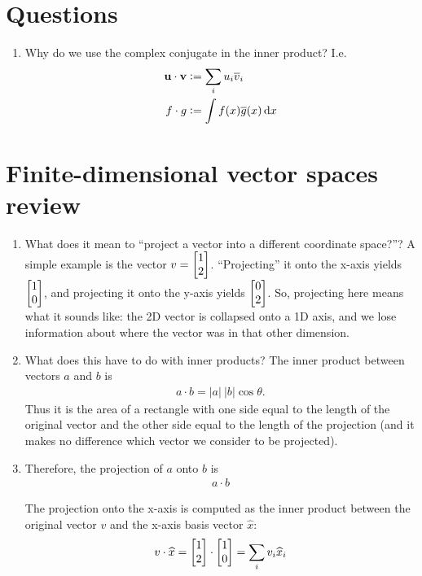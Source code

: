 \section{Questions}
\begin{enumerate}
\item Why do we use the complex conjugate in the inner product? I.e.
\begin{align*}
  \vec{u} \cdot \vec{v} &:= \sum_i u_i \bar{v}_i \\
  f \cdot g &:= \int f(x) \bar{g}(x) \dx
\end{align*}
\end{enumerate}



\section{Finite-dimensional vector spaces review}
\begin{enumerate}
\item What does it mean to ``project a vector into a different coordinate space?''? A simple example is the
  vector $v = \begin{bmatrix}1\\2\end{bmatrix}$. ``Projecting'' it onto the x-axis yields $\begin{bmatrix}1\\0\end{bmatrix}$, and projecting it onto the y-axis
  yields $\begin{bmatrix}0\\2\end{bmatrix}$. So, projecting here means what it sounds like: the 2D vector is collapsed onto a 1D axis,
  and we lose information about where the vector was in that other dimension.
\item What does this have to do with inner products? The inner product between vectors $a$ and $b$ is
\begin{align*}
  a \cdot b = |a| ~ |b|\cos\theta.
\end{align*}
Thus it is the area of a rectangle with one side equal to the length of the original vector and the other side
equal to the length of the projection (and it makes no difference which vector we consider to be projected).
\item Therefore, the projection of $a$ onto $b$ is
\begin{align*}
  a \cdot b
\end{align*}


  The projection onto the x-axis is computed as the inner
  product between the original vector $v$ and the x-axis basis vector $\hat{x}$:
\begin{align*}
  v \cdot \widehat{x} = \begin{bmatrix}1\\2\end{bmatrix} \cdot \begin{bmatrix}1\\0\end{bmatrix} = \sum_i v_i \widehat{x}_i
\end{align*}

\end{enumerate}


